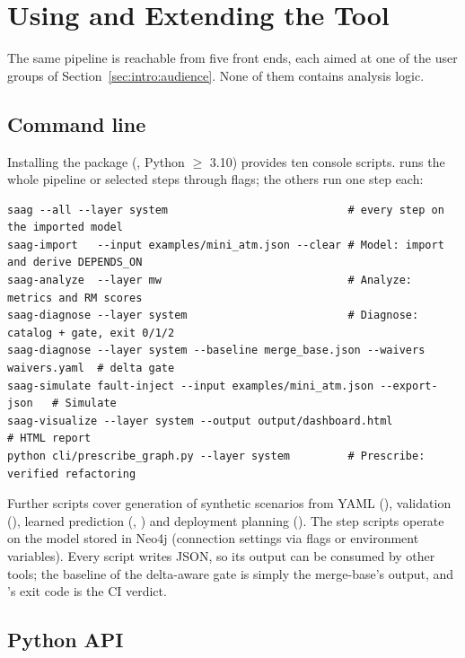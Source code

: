 \section{Using and Extending the Tool}
\label{sec:usage}

The same pipeline is reachable from five front ends, each aimed at one of the user groups of Section~\ref{sec:intro:audience}. None of them contains analysis logic.

\subsection{Command line}
\label{sec:usage:cli}

Installing the package (, Python $\ge$ 3.10) provides ten console scripts.  runs the whole pipeline or selected steps through flags; the others run one step each:
\begin{lstlisting}
saag --all --layer system                            # every step on the imported model
saag-import   --input examples/mini_atm.json --clear # Model: import and derive DEPENDS_ON
saag-analyze  --layer mw                             # Analyze: metrics and RM scores
saag-diagnose --layer system                         # Diagnose: catalog + gate, exit 0/1/2
saag-diagnose --layer system --baseline merge_base.json --waivers waivers.yaml  # delta gate
saag-simulate fault-inject --input examples/mini_atm.json --export-json   # Simulate
saag-visualize --layer system --output output/dashboard.html             # HTML report
python cli/prescribe_graph.py --layer system         # Prescribe: verified refactoring
\end{lstlisting}
Further scripts cover generation of synthetic scenarios from YAML (), validation (), learned prediction (, ) and deployment planning (). The step scripts operate on the model stored in Neo4j (connection settings via flags or environment variables). Every script writes JSON, so its output can be consumed by other tools; the baseline of the delta-aware gate is simply the merge-base's  output, and 's exit code is the CI verdict.

\subsection{Python API}
\label{sec:usage:sdk}


